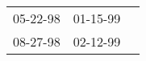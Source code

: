 \begin{supertabular}{p{0.33\columnwidth}p{0.33\columnwidth}p{0.33\columnwidth}}
 05-22-98\textsuperscript{} &  01-15-99\textsuperscript{} \\
 08-27-98\textsuperscript{} &  02-12-99\textsuperscript{} \\
\end{supertabular}
